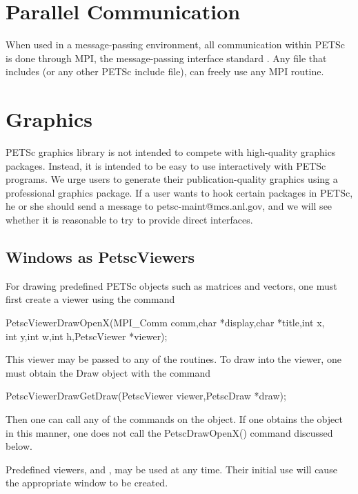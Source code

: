{{{\section{Parallel Communication}

When used in a message-passing environment, all communication 
within
PETSc is done through MPI, the message-passing interface standard
\cite{MPI-final}.  Any file that includes  (or any other 
PETSc include file), can freely use any MPI routine.

\section{Graphics}

PETSc graphics library is not intended to compete with 
high-quality graphics packages.  Instead, it is intended to be 
easy to use interactively with PETSc programs. We urge users
to generate their publication-quality graphics using a
professional graphics package. If a user wants to hook
certain packages in PETSc, he or she should send a message to 
petsc-maint@mcs.anl.gov, and we will see whether it is reasonable
to try to provide direct interfaces.

\subsection{Windows as PetscViewers}
For drawing predefined PETSc objects such as matrices and vectors, one must 
first create a viewer using the 
command 
\begin{tabbing}
  PetscViewerDrawOpenX(MPI\_Comm comm,char *display,char *title,int x,\\
                       int y,int w,int h,PetscViewer *viewer);
\end{tabbing}
This viewer may be passed to any of the  routines.
To draw into the viewer, one must obtain the Draw object with the
command 
\begin{tabbing}
  PetscViewerDrawGetDraw(PetscViewer viewer,PetscDraw *draw);
\end{tabbing}
Then one can call any of the  commands on the 
object. If one obtains the  object in this manner, 
one does not call the PetscDrawOpenX() command discussed below.

  
Predefined viewers,  
and , may be used at any time. Their initial
use will cause the appropriate window to be created.

}}}

